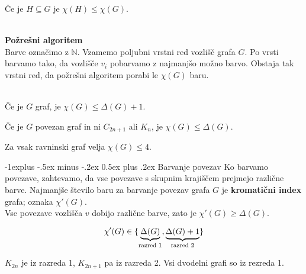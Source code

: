 \documentclass[a4paper,9pt]{extarticle}
\makeatletter
\renewcommand{\subsection}{\@startsection{subsection}{2}{0mm}%
                                {-1explus -.5ex minus -.2ex}%
                                {0.5ex plus .2ex}%
                                {\normalfont\normalsize\bfseries}}
\makeatother
\begin{document}
\begin{multicols}{3}
Če je $H \subseteq G$ je $\chi(H) \leq \chi(G)$.\\\

\textbf{Požrešni algoritem}\\
Barve označimo z $\mathbb{N}$. Vzamemo poljubni vrstni red vozlišč grafa $G$. Po vrsti barvamo tako, da 
vozlišče $v_i$ pobarvamo z najmanjšo možno barvo.
Obstaja tak vrstni red, da požrešni algoritem porabi le $\chi(G)$ baru.\\\

Če je $G$ graf, je $\chi(G) \leq \Delta(G)+1$.

Če je $G$ povezan graf in ni $C_{2n+1}$ ali $K_n$, je $\chi(G) \leq \Delta(G)$.

Za vsak ravninski graf velja $\chi(G) \leq 4$.

\subsection{Barvanje povezav}
Ko barvamo povezave, zahtevamo, da vse povezave s skupnim krajiščem prejmejo različne barve.
Najmanjše število baru za barvanje povezav grafa $G$ je \textbf{kromatični index} grafa; oznaka $\chi'(G)$.\\

Vse povezave vozlišča $v$ dobijo različne barve, zato je $\chi'(G) \geq \Delta(G)$.

\[\chi'(G) \in \{\underbrace{\Delta(G)}_\textmd{razred 1}, \underbrace{\Delta(G)+1}_\textmd{razred 2} \} \]

$K_{2n}$ je iz razreda 1, $K_{2n+1}$ pa iz razreda 2. Vsi dvodelni grafi so iz rezreda 1.
\end{multicols}
\pagebreak
\end{document}
